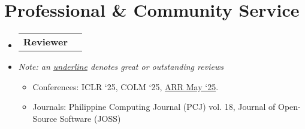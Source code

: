 \documentclass[a4paper,11pt]{article}
\makeatletter
\newcommand{\resumeItem}[1]{
  \item\small{
    {#1 \vspace{-2pt}}
  }
}
\newcommand{\resumeProjectHeading}[2]{
    \item
    \begin{tabular*}{0.97\textwidth}{l@{\extracolsep{\fill}}r}
      \small#1 & #2 \\
    \end{tabular*}\vspace{-7pt}
}
\newcommand{\resumeSubHeadingListStart}{\begin{itemize}[leftmargin=0.15in, label={}]}
\newcommand{\resumeSubHeadingListEnd}{\end{itemize}}
\newcommand{\resumeItemListStart}{\begin{itemize}}
\newcommand{\resumeItemListEnd}{\end{itemize}\vspace{-5pt}}
\makeatother
\begin{document}


\section{Professional \& Community Service}
\resumeSubHeadingListStart

\resumeProjectHeading
{\textbf{Reviewer}}{}
\resumeItem{\textit{Note: an \underline{underline} denotes great or outstanding reviews}}
\resumeItemListStart
\resumeItem{Conferences: ICLR `25, COLM `25, \underline{ARR May `25}.}
\resumeItem{Journals: Philippine Computing Journal (PCJ) vol. 18, Journal of Open-Source Software (JOSS)}
\resumeItemListEnd

\resumeSubHeadingListEnd
\end{document}

